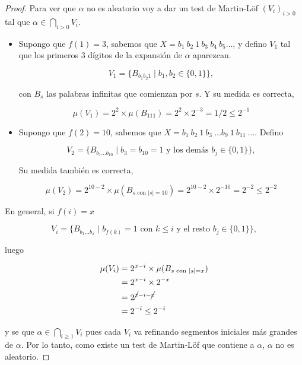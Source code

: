 \documentclass{article}
\theoremstyle{definition} %
\newcommand{\measure}[1]{\mu(#1)}
\begin{document}
\begin{proof}
    Para ver que $\alpha$ no es aleatorio voy a dar un test de Martin-Löf
    $(V_i)_{i > 0}$ tal que $\alpha \in \bigcap_{i > 0} V_i$.

    \begin{itemize}
        \item Supongo que $f(1) = 3$, sabemos que $X = b_1\ b_2\ 1\ b_3\ b_4\ b_5
        \dots$, y defino $V_1$ tal que los primeros 3 dígitos de la expansión de
        $\alpha$ aparezcan.

        \[
            V_1 = \{ 
                B_{b_1 b_2 1}
                \mid b_1, b_2 \in \{0, 1\}
            \},
        \]

        con $B_s$ las palabras infinitas que comienzan por $s$. Y su medida es
        correcta,

        \[
            \measure{V_1}
                = 2^2 \times \measure{B_{111}}
                = 2^2 \times 2^{-3} = 1/2
                \leq 2^{-1}
        \]

        \item Supongo que $f(2) = 10$, sabemos que 
        $X = b_1\ b_2\ 1\ b_3\ \dots b_9\ 1\ b_{11}\ \dots$. Defino

        \[
            V_2 = \{ 
                B_{b_1 \dots b_{10}}
                \mid b_3 = b_{10} = 1 \text{ y los demás } b_j \in \{0, 1\}
            \},
        \]

        Su medida también es correcta,

        \[
            \measure{V_2}
                = 2^{10 - 2} \times \measure{B_{s \text{ con } |s| = 10}}
                = 2^{10 - 2} \times 2^{-10} = 2^{-2}
                \leq 2^{-2}
        \]
    \end{itemize}

    En general, si $f(i) = x$

    \[
        V_i = \{ 
            B_{b_1 \dots b_{x}}
            \mid b_{f(k)} = 1 \text{ con } k \leq i \text{ y el resto } b_j \in \{0, 1\}
        \},
    \]

    luego

    \begin{align*}
        \measure{V_i}
            &= 2^{x - i} \times \measure{B_{s \text{ con } |s| = x}} \\
            &= 2^{x - i} \times 2^{-x} \\
            &= 2^{\cancel{x} - i - \cancel{x}} \\
            &= 2^{-i} \leq 2^{-i}
    \end{align*}

    y se que $\alpha \in \bigcap_{i \geq 1} V_i$ pues cada $V_i$ va refinando
    segmentos iniciales más grandes de $\alpha$. Por lo tanto, como existe un
    test de Martin-Löf que contiene a $\alpha$, $\alpha$ no es aleatorio.
\end{proof}
\end{document}
